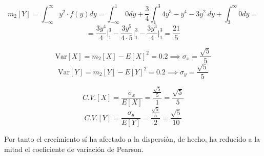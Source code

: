 $$m_2[Y] = \int_{-\infty}^{\infty} y^2\cdot f(y)dy = \int_{-\infty}^1 0dy + \dfrac{3}{4} \int_1^3 4y^3 - y^4 -3y^2\ dy + \int_3^{\infty} 0dy = $$ 
$$= \dfrac{3y^4}{4} \biggr\rvert_1^3 - \dfrac{3y^5}{4\cdot5}\biggr\rvert_1^3 - \dfrac{3y^3}{4}\biggr\rvert_1^3= \dfrac{21}{5}$$

$$\mbox{Var}[X] = m_2[X] - E[X]^2 = 0.2 \implies \sigma_x = \dfrac{\sqrt{5}}{5}$$
$$\mbox{Var}[Y] = m_2[Y] - E[Y]^2 = 0.2 \implies \sigma_y = \dfrac{\sqrt{5}}{5}$$

$$C.V.[X] = \dfrac{\sigma_x}{E[X]} = \dfrac{\frac{\sqrt{5}}{5}}{1} = \dfrac{\sqrt{5}}{5}$$
$$C.V.[Y] = \dfrac{\sigma_y}{E[Y]} = \dfrac{\frac{\sqrt{5}}{5}}{2} = \dfrac{\sqrt{5}}{10}$$

Por tanto el crecimiento sí ha afectado a la dispersión, de hecho, ha reducido a la mitad el coeficiente de variación de Pearson.


